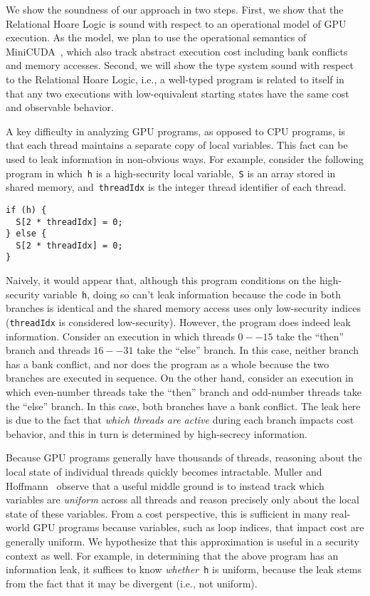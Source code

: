 We show the soundness of our approach in two steps.
%
First, we show that the Relational Hoare Logic is sound with respect to an operational model of GPU execution.
%
As the model, we plan to use the operational semantics of MiniCUDA~\cite{MullerHo21}, which also track abstract execution cost including bank conflicts and memory accesses.
%
Second, we will show the type system sound with respect to the Relational Hoare Logic, i.e., a well-typed program is related to itself in that any two executions with low-equivalent starting states have the same cost and observable behavior.


A key difficulty in analyzing GPU programs, as opposed to CPU programs, is that each thread maintains a separate copy of local variables.
%
This fact can be used to leak information in non-obvious ways.
%
For example, consider the following program in which~\lstinline{h} is a high-security local variable,~\lstinline{S} is an array stored in shared memory, and~\lstinline{threadIdx} is the integer thread identifier of each thread.

\begin{lstlisting}
if (h) {
  S[2 * threadIdx] = 0;
} else {
  S[2 * threadIdx] = 0;
}
\end{lstlisting}

Naively, it would appear that, although this program conditions on the high-security variable~\lstinline{h}, doing so can't leak information because the code in both branches is identical and the shared memory access uses only low-security indices (\lstinline{threadIdx} is considered low-security).
%
However, the program does indeed leak information.
%
Consider an execution in which threads $0--15$ take the ``then'' branch and threads $16--31$ take the ``else'' branch.
%
In this case, neither branch has a bank conflict, and nor does the program as a whole because the two branches are executed in sequence.
%
On the other hand, consider an execution in which even-number threads take the ``then'' branch and odd-number threads take the ``else'' branch.
%
In this case, both branches have a bank conflict.
%
The leak here is due to the fact that {\em which threads are active} during each branch impacts cost behavior, and this in turn is determined by high-secrecy information.
%

Because GPU programs generally have thousands of threads, reasoning about the local state of individual threads quickly becomes intractable.
%
Muller and Hoffmann~\cite{MullerHo21} observe that a useful middle ground is to instead track which variables are {\em uniform} across all threads and reason precisely only about the local state of these variables.
%
From a cost perspective, this is sufficient in many real-world GPU programs because variables, such as loop indices, that impact cost are generally uniform.
%
We hypothesize that this approximation is useful in a security context as well.
%
For example, in determining that the above program has an information leak, it suffices to know {\em whether}~\lstinline{h} is uniform, because the leak stems from the fact that it may be divergent (i.e., not uniform).

